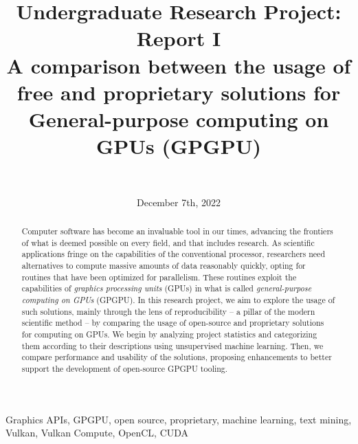 \documentclass[11pt, conference, onecolumn, final]{IEEEtran}
\begin{document}
\title{\textbf{Undergraduate Research Project: Report I} \\
{A comparison between the usage of free and proprietary solutions for General-purpose computing on GPUs (GPGPU)}
}

\date{December 7th, 2022}

\author{ \\
\and
{}
}

\maketitle

\begin{abstract}
    Computer software has become an invaluable tool in our times, advancing
    the frontiers of what is deemed possible on every field, and that includes
    research.
    As scientific applications fringe on the capabilities of the conventional
    processor, researchers need alternatives to compute massive amounts of data
    reasonably quickly, opting for routines that have been optimized for
    parallelism.
    These routines exploit the capabilities of \textit{graphics processing
    units} (GPUs) in what is called \textit{general-purpose computing on GPUs}
    (GPGPU).
    In this research project, we aim to explore the usage of such solutions,
    mainly through the lens of reproducibility -- a pillar of the modern
    scientific method -- by comparing the usage of open-source and proprietary
    solutions for computing on GPUs.
    We begin by analyzing project statistics and categorizing them according to
    their descriptions using unsupervised machine learning.
    Then, we compare performance and usability of the solutions, proposing
    enhancements to better support the development of open-source GPGPU
    tooling.
\end{abstract}

\begin{IEEEkeywords}
    Graphics APIs, GPGPU, open source, proprietary, machine learning, text
    mining, Vulkan, Vulkan Compute, OpenCL, CUDA
\end{IEEEkeywords}
\end{document}
